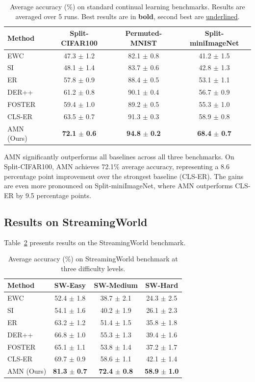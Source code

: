 \documentclass[11pt]{article}
\begin{document}
\begin{table}[h]
\centering
\caption{Average accuracy (\%) on standard continual learning benchmarks. Results are averaged over 5 runs. Best results are in \textbf{bold}, second best are \underline{underlined}.}
\label{tab:standard}
\begin{tabular}{lccc}
\hline
Method & Split-CIFAR100 & Permuted-MNIST & Split-miniImageNet \\
\hline
EWC & 47.3 $\pm$ 1.2 & 82.1 $\pm$ 0.8 & 41.2 $\pm$ 1.5 \\
SI & 48.1 $\pm$ 1.4 & 83.7 $\pm$ 0.6 & 42.8 $\pm$ 1.3 \\
ER & 57.8 $\pm$ 0.9 & 88.4 $\pm$ 0.5 & 53.1 $\pm$ 1.1 \\
DER++ & 61.2 $\pm$ 0.8 & 90.1 $\pm$ 0.4 & 56.7 $\pm$ 0.9 \\
FOSTER & 59.4 $\pm$ 1.0 & 89.2 $\pm$ 0.5 & 55.3 $\pm$ 1.0 \\
CLS-ER & 63.5 $\pm$ 0.7 & 91.3 $\pm$ 0.3 & 58.9 $\pm$ 0.8 \\
\hline
AMN (Ours) & \textbf{72.1} $\pm$ \textbf{0.6} & \textbf{94.8} $\pm$ \textbf{0.2} & \textbf{68.4} $\pm$ \textbf{0.7} \\
\hline
\end{tabular}
\end{table}

AMN significantly outperforms all baselines across all three benchmarks. On Split-CIFAR100, AMN achieves 72.1\% average accuracy, representing a 8.6 percentage point improvement over the strongest baseline (CLS-ER). The gains are even more pronounced on Split-miniImageNet, where AMN outperforms CLS-ER by 9.5 percentage points.

\subsection{Results on StreamingWorld}

Table~\ref{tab:streaming} presents results on the StreamingWorld benchmark.

\begin{table}[h]
\centering
\caption{Average accuracy (\%) on StreamingWorld benchmark at three difficulty levels.}
\label{tab:streaming}
\begin{tabular}{lccc}
\hline
Method & SW-Easy & SW-Medium & SW-Hard \\
\hline
EWC & 52.4 $\pm$ 1.8 & 38.7 $\pm$ 2.1 & 24.3 $\pm$ 2.5 \\
SI & 54.1 $\pm$ 1.6 & 40.2 $\pm$ 1.9 & 26.1 $\pm$ 2.3 \\
ER & 63.2 $\pm$ 1.2 & 51.4 $\pm$ 1.5 & 35.8 $\pm$ 1.8 \\
DER++ & 66.8 $\pm$ 1.0 & 55.3 $\pm$ 1.3 & 39.4 $\pm$ 1.6 \\
FOSTER & 65.1 $\pm$ 1.1 & 53.8 $\pm$ 1.4 & 37.2 $\pm$ 1.7 \\
CLS-ER & 69.7 $\pm$ 0.9 & 58.6 $\pm$ 1.1 & 42.1 $\pm$ 1.4 \\
\hline
AMN (Ours) & \textbf{81.3} $\pm$ \textbf{0.7} & \textbf{72.4} $\pm$ \textbf{0.8} & \textbf{58.9} $\pm$ \textbf{1.0} \\
\hline
\end{tabular}
\end{table}
\end{document}
